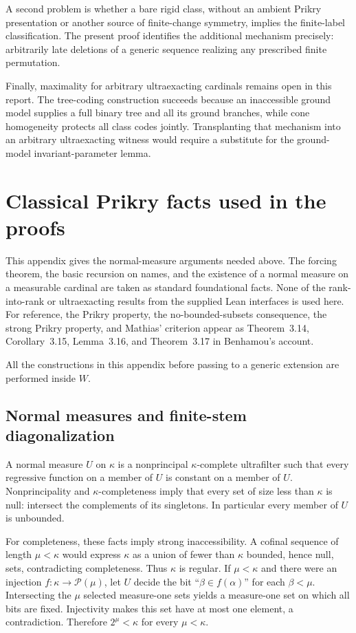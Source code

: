 \documentclass[11pt,letterpaper]{article}
\theoremstyle{definition}
\numberwithin{equation}{section}
\newcommand{\Pow}{\mathcal P}
\begin{document}
A second problem is whether a bare rigid class, without an ambient Prikry presentation or another source of finite-change symmetry, implies the finite-label classification. The present proof identifies the additional mechanism precisely: arbitrarily late deletions of a generic sequence realizing any prescribed finite permutation.

Finally, maximality for arbitrary ultraexacting cardinals remains open in this report. The tree-coding construction succeeds because an inaccessible ground model supplies a full binary tree and all its ground branches, while cone homogeneity protects all class codes jointly. Transplanting that mechanism into an arbitrary ultraexacting witness would require a substitute for the ground-model invariant-parameter lemma.

\appendix
\section{Classical Prikry facts used in the proofs}\label{app:prikry}

This appendix gives the normal-measure arguments needed above. The forcing theorem, the basic recursion on names, and the existence of a normal measure on a measurable cardinal are taken as standard foundational facts. None of the rank-into-rank or ultraexacting results from the supplied Lean interfaces is used here. For reference, the Prikry property, the no-bounded-subsets consequence, the strong Prikry property, and Mathias' criterion appear as Theorem~3.14, Corollary~3.15, Lemma~3.16, and Theorem~3.17 in Benhamou's account.\cite{benhamou}

All the constructions in this appendix before passing to a generic extension are performed inside $W$.

\subsection{Normal measures and finite-stem diagonalization}

A normal measure $U$ on $\kappa$ is a nonprincipal $\kappa$-complete ultrafilter such that every regressive function on a member of $U$ is constant on a member of $U$. Nonprincipality and $\kappa$-completeness imply that every set of size less than $\kappa$ is null: intersect the complements of its singletons. In particular every member of $U$ is unbounded.

For completeness, these facts imply strong inaccessibility. A cofinal sequence of length $\mu<\kappa$ would express $\kappa$ as a union of fewer than $\kappa$ bounded, hence null, sets, contradicting completeness. Thus $\kappa$ is regular. If $\mu<\kappa$ and there were an injection $f:\kappa\to\Pow(\mu)$, let $U$ decide the bit ``$\beta\in f(\alpha)$'' for each $\beta<\mu$. Intersecting the $\mu$ selected measure-one sets yields a measure-one set on which all bits are fixed. Injectivity makes this set have at most one element, a contradiction. Therefore $2^\mu<\kappa$ for every $\mu<\kappa$.
\end{document}
